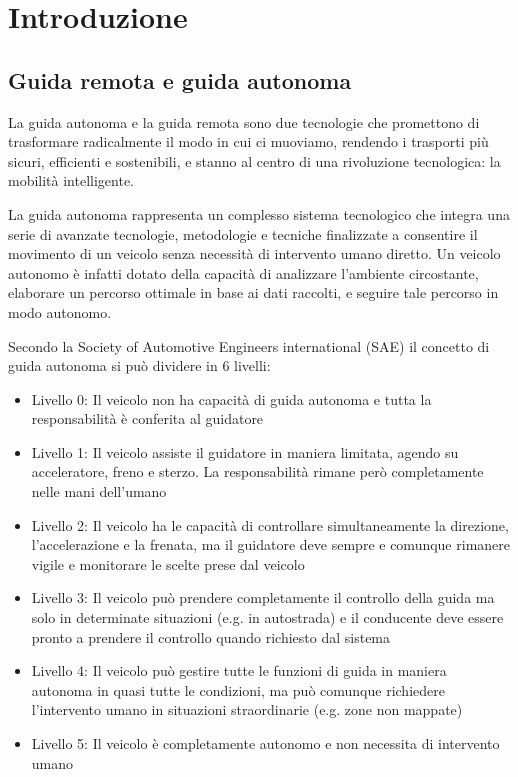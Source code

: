 \section{Introduzione} \label{introduzione}
\subsection{Guida remota e guida autonoma}
La guida autonoma e la guida remota sono due tecnologie che promettono di trasformare radicalmente il modo in cui ci muoviamo, rendendo i trasporti più sicuri, efficienti e sostenibili, e stanno al centro di una rivoluzione tecnologica: la mobilità intelligente.

\noindent La guida autonoma rappresenta un complesso sistema tecnologico che integra una serie di avanzate tecnologie, metodologie e tecniche finalizzate a consentire il movimento di un veicolo senza necessità di intervento umano diretto. Un veicolo autonomo è infatti dotato della capacità di analizzare l'ambiente circostante, elaborare un percorso ottimale in base ai dati raccolti, e seguire tale percorso in modo autonomo. 

\noindent Secondo la Society of Automotive Engineers international (SAE)\cite{SAE_autonomous_vehicle} il concetto di guida autonoma si può dividere in 6 livelli:

\begin{itemize}
  \item Livello 0: Il veicolo non ha capacità di guida autonoma e tutta la responsabilità è conferita al guidatore  
  \item Livello 1: Il veicolo assiste il guidatore in maniera limitata, agendo su acceleratore, freno e sterzo. La responsabilità rimane però completamente nelle mani dell'umano 
  \item Livello 2: Il veicolo ha le capacità di controllare simultaneamente la direzione, l'accelerazione e la frenata, ma il guidatore deve sempre e comunque rimanere vigile e monitorare le scelte prese dal veicolo
  \item Livello 3: Il veicolo può prendere completamente il controllo della guida ma solo in determinate situazioni (e.g. in autostrada) e il conducente deve essere pronto a prendere il controllo quando richiesto dal sistema
  \item Livello 4: Il veicolo può gestire tutte le funzioni di guida in maniera autonoma in quasi tutte le condizioni, ma può comunque richiedere l'intervento umano in situazioni straordinarie (e.g. zone non mappate)
  \item Livello 5: Il veicolo è completamente autonomo e non necessita di intervento umano
\end{itemize}


